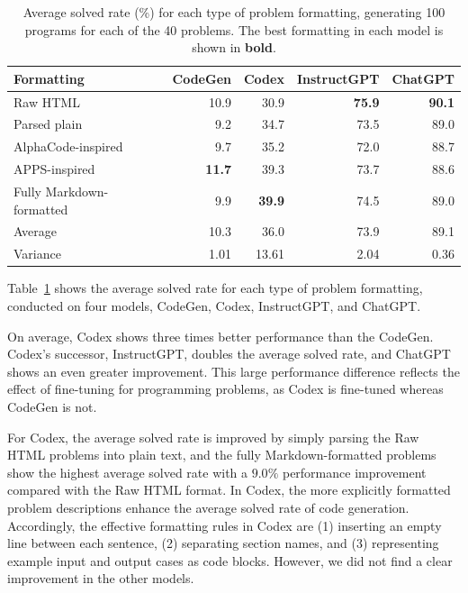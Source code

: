 \documentclass{article}
\newcommand{\bn}[1]{\textsf{\textbf{#1}}}
\begin{document}
\begin{table}[ht]
\begin{center}
\begin{minipage}{0.8\linewidth}
    \caption{Average solved rate (\%) for each type of problem formatting, generating 100 programs for each of the 40 problems. The best formatting in each model is shown in \bn{bold}.}
    \label{table:problems-result}
    \begin{tabular*}{\linewidth}{lrrrr}
        \toprule
        Formatting & CodeGen & Codex & InstructGPT & ChatGPT \\
        \midrule
        Raw HTML & 10.9 & 30.9 & \bn{75.9} & \bn{90.1} \\
        Parsed plain & 9.2 & 34.7 & 73.5 & 89.0 \\
        AlphaCode-inspired & 9.7 & 35.2 & 72.0 & 88.7 \\
        APPS-inspired & \bn{11.7} & 39.3 & 73.7 & 88.6 \\
        Fully Markdown-formatted & 9.9 & \bn{39.9} & 74.5 & 89.0 \\
        \midrule
        Average & 10.3 & 36.0 & 73.9 & 89.1 \\
        Variance & 1.01 & 13.61 & 2.04 & 0.36 \\
        \bottomrule
    \end{tabular*}
\end{minipage}
\end{center}
\end{table}

Table~\ref{table:problems-result} shows the average solved rate for each type of problem formatting, conducted on four models, CodeGen, Codex, InstructGPT, and ChatGPT.

On average, Codex shows three times better performance than the CodeGen.
Codex's successor, InstructGPT, doubles the average solved rate, and ChatGPT shows an even greater improvement.
This large performance difference reflects the effect of fine-tuning for programming problems, as Codex is fine-tuned whereas CodeGen is not.

For Codex, the average solved rate is improved by simply parsing the Raw HTML problems into plain text, and the fully Markdown-formatted problems show the highest average solved rate with a $9.0\%$ performance improvement compared with the Raw HTML format.
In Codex, the more explicitly formatted problem descriptions enhance the average solved rate of code generation.
Accordingly, the effective formatting rules in Codex are (1) inserting an empty line between each sentence, (2) separating section names, and (3) representing example input and output cases as code blocks.
However, we did not find a clear improvement in the other models.
\end{document}
